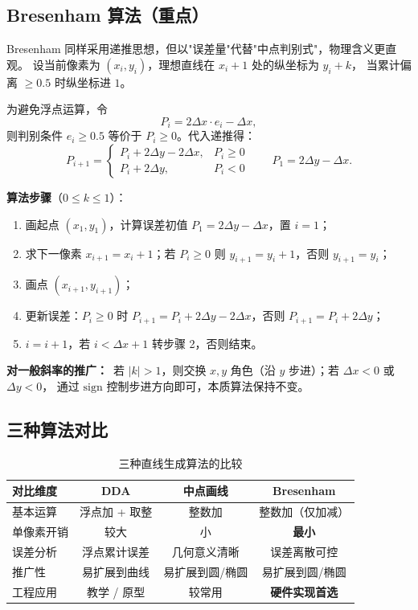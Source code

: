 \documentclass[a4paper,12pt]{ctexart}
\begin{document}
\subsection{Bresenham 算法（重点）}

Bresenham 同样采用递推思想，但以"误差量"代替"中点判别式"，物理含义更直观。
设当前像素为 $(x_i,y_i)$，理想直线在 $x_i+1$ 处的纵坐标为 $y_i+k$，
当累计偏离 $\ge 0.5$ 时纵坐标进 $1$。

为避免浮点运算，令
\[
    P_i = 2\Delta x \cdot e_i - \Delta x ,
\]
则判别条件 $e_i \ge 0.5$ 等价于 $P_i \ge 0$。代入递推得：
\[
    P_{i+1} =
    \begin{cases}
        P_i + 2\Delta y - 2\Delta x, & P_i \ge 0 \\
        P_i + 2\Delta y,             & P_i < 0
    \end{cases}
    \qquad
    P_1 = 2\Delta y - \Delta x.
\]

\textbf{算法步骤}（$0\le k\le 1$）：
\begin{enumerate}[leftmargin=2em,itemsep=0.2em]
    \item 画起点 $(x_1,y_1)$，计算误差初值 $P_1 = 2\Delta y - \Delta x$，置 $i=1$；
    \item 求下一像素 $x_{i+1}=x_i+1$；若 $P_i \ge 0$ 则 $y_{i+1}=y_i+1$，否则 $y_{i+1}=y_i$；
    \item 画点 $(x_{i+1}, y_{i+1})$；
    \item 更新误差：$P_i \ge 0$ 时 $P_{i+1}=P_i+2\Delta y-2\Delta x$，否则 $P_{i+1}=P_i+2\Delta y$；
    \item $i=i+1$，若 $i<\Delta x+1$ 转步骤 2，否则结束。
\end{enumerate}

\textbf{对一般斜率的推广：}\ 若 $|k|>1$，则交换 $x,y$ 角色（沿 $y$ 步进）；若 $\Delta x<0$ 或 $\Delta y<0$，
通过 $\mathrm{sign}$ 控制步进方向即可，本质算法保持不变。

\subsection{三种算法对比}

\begin{table}[H]
\centering
\renewcommand{\arraystretch}{1.3}
\begin{tabular}{lccc}
\toprule
对比维度 & DDA & 中点画线 & Bresenham \\
\midrule
基本运算  & 浮点加 + 取整 & 整数加 & 整数加（仅加减）\\
单像素开销 & 较大 & 小 & \textbf{最小} \\
误差分析 & 浮点累计误差 & 几何意义清晰 & 误差离散可控 \\
推广性 & 易扩展到曲线 & 易扩展到圆/椭圆 & 易扩展到圆/椭圆 \\
工程应用 & 教学 / 原型 & 较常用 & \textbf{硬件实现首选} \\
\bottomrule
\end{tabular}
\caption{三种直线生成算法的比较}
\end{table}
\end{document}
